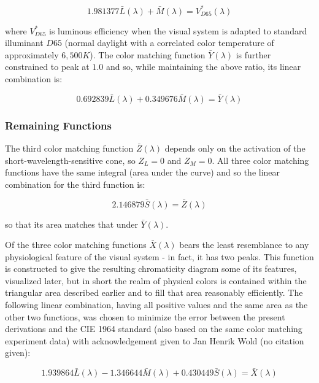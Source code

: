\documentclass{article}
\begin{document}
\begin{multicols}{2}
\begin{equation} %
    1.981377\bar{L}(\lambda)+\bar{M}(\lambda)=V^*_{D65}(\lambda)
\end{equation}

where $V^*_{D65}$ is luminous efficiency when the visual system is adapted to standard illuminant $D65$ (normal daylight with a correlated color temperature of approximately $6,500K$).  The color matching function $\bar{Y}(\lambda)$ is further constrained to peak at $1.0$ and so, while maintaining the above ratio, its linear combination is:

\begin{equation} %
    0.692839\bar{L}(\lambda)+0.349676\bar{M}(\lambda)=\bar{Y}(\lambda)
\end{equation}

\subsubsection{Remaining Functions} %

The third color matching function $\bar{Z}(\lambda)$ depends only on the activation of the short-wavelength-sensitive cone, so $Z_L=0$ and $Z_M=0$.  All three color matching functions have the same integral (area under the curve) and so the linear combination for the third function is:

\begin{equation} %
    2.146879\bar{S}(\lambda)=\bar{Z}(\lambda)
\end{equation}

so that its area matches that under $\bar{Y}(\lambda)$.

Of the three color matching functions $\bar{X}(\lambda)$ bears the least resemblance to any physiological feature of the visual system - in fact, it has two peaks.  This function is constructed to give the resulting chromaticity diagram some of its features, visualized later, but in short the realm of physical colors is contained within the triangular area described earlier and to fill that area reasonably efficiently.  The following linear combination, having all positive values and the same area as the other two functions, was chosen to minimize the error between the present derivations and the CIE 1964 standard (also based on the same color matching experiment data) with acknowledgement given to Jan Henrik Wold (no citation given):

\begin{equation} %
    1.939864\bar{L}(\lambda)-1.346644\bar{M}(\lambda)+0.430449\bar{S}(\lambda)=\bar{X}(\lambda)
\end{equation}


\end{multicols}
\end{document}
